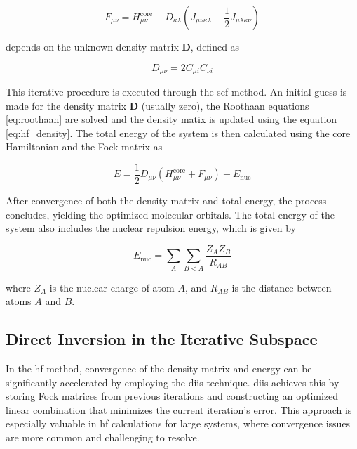\begin{equation}\label{eq:fock}
F_{\mu\nu}=H_{\mu\nu}^{\mathrm{core}}+D_{\kappa\lambda}\left(J_{\mu\nu\kappa\lambda}-\frac{1}{2}J_{\mu\lambda\kappa\nu}\right)
\end{equation}

depends on the unknown density matrix \(\mathbf{D}\), defined as

\begin{equation}\label{eq:hf_density}
D_{\mu\nu}=2C_{\mu i}C_{\nu i}
\end{equation}

This iterative procedure is executed through the \acrfull{scf} method. An initial guess is made for the density matrix \(\mathbf{D}\) (usually zero), the Roothaan equations \eqref{eq:roothaan} are solved and the density matix is updated using the equation \eqref{eq:hf_density}. The total energy of the system is then calculated using the core Hamiltonian and the Fock matrix as

\begin{equation}
E=\frac{1}{2}D_{\mu\nu}(H_{\mu\nu}^{\mathrm{core}}+F_{\mu\nu})+E_{\mathrm{nuc}}
\end{equation}

After convergence of both the density matrix and total energy, the process concludes, yielding the optimized molecular orbitals. The total energy of the system also includes the nuclear repulsion energy, which is given by

\begin{equation}
E_{\mathrm{nuc}}=\sum_{A}\sum_{B<A}\frac{Z_{A}Z_{B}}{R_{AB}}
\end{equation}

where \(Z_A\) is the nuclear charge of atom \(A\), and \(R_{AB}\) is the distance between atoms \(A\) and \(B\).

\subsection{Direct Inversion in the Iterative Subspace}

In the \acrshort{hf} method, convergence of the density matrix and energy can be significantly accelerated by employing the \acrfull{diis} technique. \acrshort{diis} achieves this by storing Fock matrices from previous iterations and constructing an optimized linear combination that minimizes the current iteration's error. This approach is especially valuable in \acrshort{hf} calculations for large systems, where convergence issues are more common and challenging to resolve.

